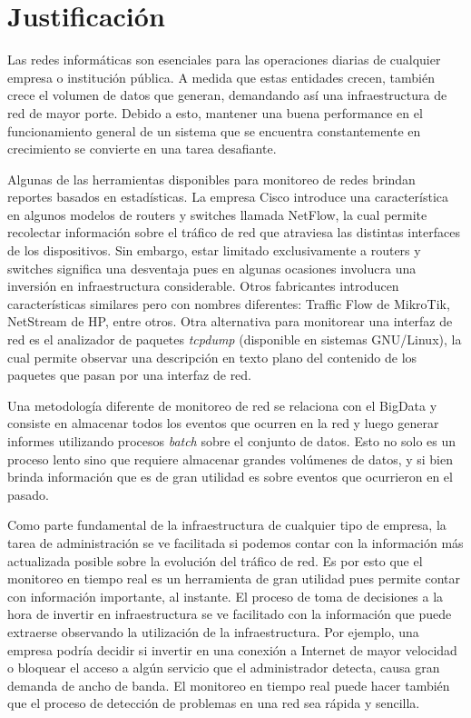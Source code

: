 \section*{Justificación}
Las redes informáticas son esenciales para las operaciones diarias de cualquier empresa o institución pública. A medida que estas entidades crecen, también crece el volumen de datos que generan, demandando así una infraestructura de red de mayor porte. Debido a esto, mantener una buena performance en el funcionamiento general de un sistema que se encuentra constantemente en crecimiento se convierte en una tarea desafiante.

Algunas de las herramientas disponibles para monitoreo de redes brindan reportes basados en estadísticas. La empresa Cisco\textsuperscript{\textregistered} introduce una característica en algunos modelos de routers y switches llamada NetFlow, la cual permite recolectar información sobre el tráfico de red que atraviesa las distintas interfaces de los dispositivos. Sin embargo, estar limitado exclusivamente a routers y switches significa una desventaja pues en algunas ocasiones involucra una inversión en infraestructura considerable. Otros fabricantes introducen características similares pero con nombres diferentes: Traffic Flow de MikroTik, NetStream de HP, entre otros.
Otra alternativa para monitorear una interfaz de red es el analizador de paquetes \textit{tcpdump} (disponible en sistemas GNU/Linux), la cual permite observar una descripción en texto plano del contenido de los paquetes que pasan por una interfaz de red.

Una metodología diferente de monitoreo de red se relaciona con el BigData y consiste en almacenar todos los eventos que ocurren en la red y luego generar informes utilizando procesos \textit{batch} sobre el conjunto de datos. Esto no solo es un proceso lento sino que requiere almacenar grandes volúmenes de datos, y si bien brinda información que es de gran utilidad es sobre eventos que ocurrieron en el pasado.

Como parte fundamental de la infraestructura de cualquier tipo de empresa, la tarea de administración se ve facilitada si podemos contar con la información más actualizada posible sobre la evolución del tráfico de red. Es por esto que el monitoreo en tiempo real es un herramienta de gran utilidad pues permite contar con información importante, al instante. El proceso de toma de decisiones a la hora de invertir en infraestructura se ve facilitado con la información que puede extraerse observando la utilización de la infraestructura. Por ejemplo, una empresa podría decidir si invertir en una conexión a Internet de mayor velocidad o bloquear el acceso a algún servicio que el administrador detecta, causa gran demanda de ancho de banda. El monitoreo en tiempo real puede hacer también que el proceso de detección de problemas en una red sea rápida y sencilla.

